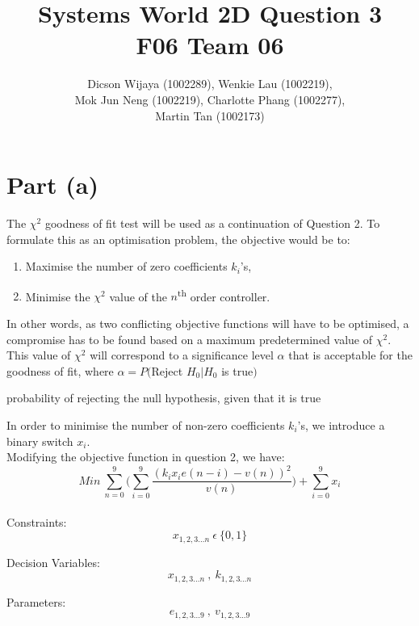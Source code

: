 \documentclass[12pt,a4paper]{article}
\author{Dicson Wijaya (1002289), Wenkie Lau (1002219), \\ Mok Jun Neng (1002219), Charlotte Phang (1002277), \\ Martin Tan (1002173)}
\title{Systems World 2D Question 3\\ F06 Team 06}
\begin{document}
	
	\maketitle
	
	\section{Part (a)}
	The $\chi^2$ goodness of fit test will be used as a continuation of Question 2.
	To formulate this as an optimisation problem, the objective would be to:
	\begin{enumerate}
		\item Maximise the number of zero coefficients $k_i$'s,
		\item Minimise the $\chi^2$ value of the $n$\textsuperscript{th} order controller.
	\end{enumerate}
	In other words, as two conflicting objective functions will have to be optimised, a compromise has to be found based on a maximum predetermined value of $\chi^2$. This value of $\chi^2$ will correspond to a significance level $\alpha$ that is acceptable for the goodness of fit, where $\alpha = P($Reject $H_0|H_0$ is true$)$
	
	probability of rejecting the null hypothesis, given that it is true
	
	In order to minimise the number of non-zero coefficients $k_i$'s, we introduce a binary switch $x_i$. \\
	
	Modifying the objective function in question 2, we have: $$Min \ \sum_{n=0}^{9} \bigg( \sum_{i=0}^{9} \frac{(k_i x_i e(n-i) - v(n))^2}{v(n)} \bigg) + \sum_{i=0}^{9} x_i$$ \\
	
	Constraints: $$x_{1,2,3...n} \ \epsilon \ \{ 0,1 \}$$
	
	Decision Variables: $$x_{1,2,3...n} \ , \ k_{1,2,3...n}$$
	
	Parameters: $$e_{1,2,3...9} \ , \ v_{1,2,3...9}$$
	
\end{document}
